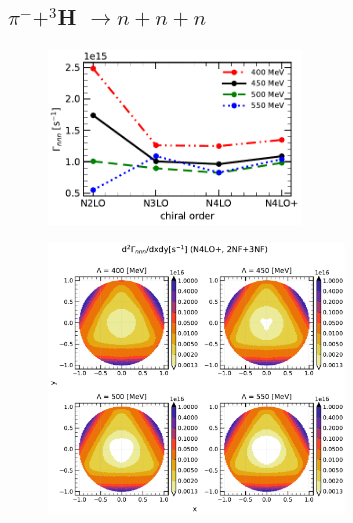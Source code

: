     \clearpage
    \subsection{$\pi^- + ^3$H $\rightarrow n + n + n$}

    \begin{figure}[h]
        \begin{center}
        \includegraphics[width=0.6\textwidth]{PlotData/PION/Dalitz_maps/figures/Gamma_nnn.pdf}
        \end{center}
        \caption{}
        \label{Gamma_nnn}
    \end{figure}


    \begin{figure}[h]
        \begin{center}
        \includegraphics[width=0.7\textwidth]{PlotData/PION/Dalitz_maps/figures/Dalitz_map_nnn_xy_cutofs.pdf}
        \end{center}
        \caption{}
        \label{pion_nnn_xy_cutoff}
    \end{figure}

